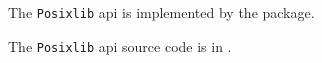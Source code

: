 

The {\tt Posixlib} api is implemented by the  package.

The {\tt Posixlib} api source code is in .

